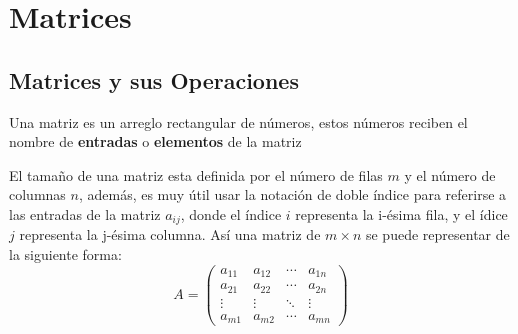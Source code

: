 \chapter{Matrices}
\section{Matrices y sus Operaciones }
\begin{definition}[Matriz]
	Una matriz es un arreglo rectangular de números, estos números reciben el nombre de \textbf{entradas} o \textbf{elementos} de la matriz
\end{definition}
El tamaño de una matriz esta definida por el número de filas $m$ y el número de columnas $n$, además, es muy útil usar la notación de doble índice para referirse a las entradas de la matriz $a_{ij}$, donde el índice $i$ representa la i-ésima fila, y el ídice $j$ representa la j-ésima columna. Así una matriz de $m\times n$ se puede representar de la siguiente forma: 
\begin{equation}
	A = \left(  \begin{matrix}
		a_{11} & a_{12} &\cdots   &  a_{1n}\\
		a_{21}& a_{22} & \cdots  & a_{2n} \\
		\vdots &\vdots   &  \ddots & \vdots  \\
		a_{m1} & a_{m2} & \cdots  & a_{mn}
	\end{matrix}\right)
\end{equation}

